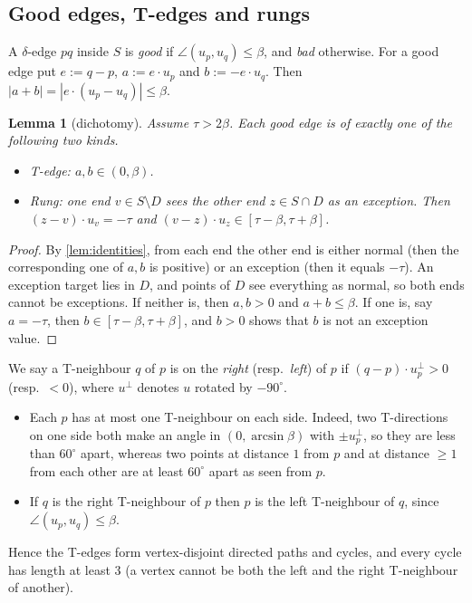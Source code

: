 \documentclass[11pt]{amsart}
\newtheorem{lemma}[theorem]{Lemma}
\theoremstyle{definition}
\theoremstyle{remark}
\begin{document}
\subsection*{Good edges, T-edges and rungs}
A $\delta$-edge $pq$ inside $S$ is \emph{good} if $\angle(u_p,u_q)\le\beta$, and \emph{bad} otherwise. For a good edge put $e:=q-p$, $a:=e\cdot u_p$ and $b:=-e\cdot u_q$. Then $|a+b|=|e\cdot(u_p-u_q)|\le\beta$.

\begin{lemma}[dichotomy]\label{lem:dichotomy}
Assume $\tau>2\beta$. Each good edge is of exactly one of the following two kinds.
\begin{itemize}[leftmargin=2em]
\item \emph{T-edge:} $a,b\in(0,\beta)$.
\item \emph{Rung:} one end $v\in S\setminus D$ sees the other end $z\in S\cap D$ as an exception. Then $(z-v)\cdot u_v=-\tau$ and $(v-z)\cdot u_z\in[\tau-\beta,\tau+\beta]$.
\end{itemize}
\end{lemma}
\begin{proof}
By \cref{lem:identities}, from each end the other end is either normal (then the corresponding one of $a,b$ is positive) or an exception (then it equals $-\tau$). An exception target lies in $D$, and points of $D$ see everything as normal, so both ends cannot be exceptions. If neither is, then $a,b>0$ and $a+b\le\beta$. If one is, say $a=-\tau$, then $b\in[\tau-\beta,\tau+\beta]$, and $b>0$ shows that $b$ is not an exception value.
\end{proof}

We say a T-neighbour $q$ of $p$ is on the \emph{right} (resp.\ \emph{left}) of $p$ if $(q-p)\cdot u_p^{\perp}>0$ (resp.\ $<0$), where $u^\perp$ denotes $u$ rotated by $-90^\circ$.
\begin{itemize}[leftmargin=2em]
\item[(T1)] Each $p$ has at most one T-neighbour on each side. Indeed, two T-directions on one side both make an angle in $(0,\arcsin\beta)$ with $\pm u_p^\perp$, so they are less than $60^\circ$ apart, whereas two points at distance $1$ from $p$ and at distance $\ge 1$ from each other are at least $60^\circ$ apart as seen from $p$.
\item[(T2)] If $q$ is the right T-neighbour of $p$ then $p$ is the left T-neighbour of $q$, since $\angle(u_p,u_q)\le\beta$.
\end{itemize}
Hence the T-edges form vertex-disjoint directed paths and cycles, and every cycle has length at least $3$ (a vertex cannot be both the left and the right T-neighbour of another).
\end{document}
